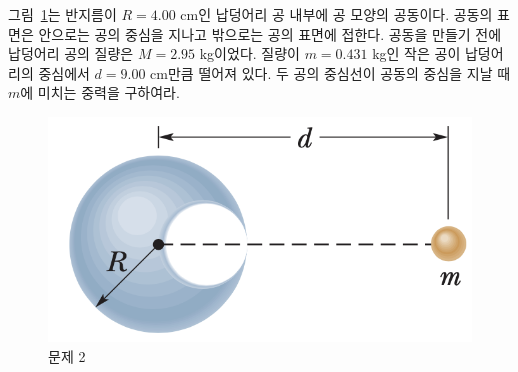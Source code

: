 \documentclass[floatfix,nofootinbib,superscriptaddress,fleqn]{revtex4-2}
\begin{document}
그림~\ref{fig:2}는 반지름이 $R=4.00$ cm인 납덩어리 공 내부에 공 모양의
공동이다. 공동의 표면은 안으로는 공의 중심을 지나고 밖으로는 공의
표면에 접한다. 공동을 만들기 전에 납덩어리 공의 질량은 $M=2.95$
kg이었다. 질량이 $m=0.431$ kg인 작은 공이 납덩어리의 중심에서 $d=9.00$
cm만큼 떨어져 있다. 두 공의 중심선이 공동의 중심을 지날 때 $m$에
미치는 중력을 구하여라.
\begin{figure}[htp]
  \centering
\includegraphics[scale=0.5]{Qfig13-1-20220425.png}
  \caption{문제 2}
  \label{fig:2}
\end{figure}
\end{document}
